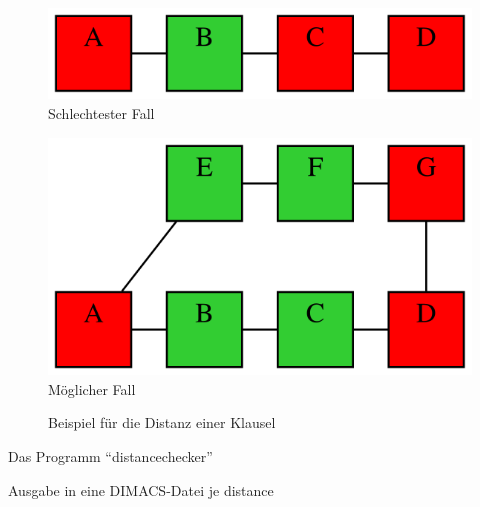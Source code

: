 \begin{figure}[!h]
  \centering
  \begin{minipage}[b]{6cm}
    \centering
    \includegraphics[scale=0.6]{images/distance1}\\
    Schlechtester Fall
  \end{minipage}
  \begin{minipage}[b]{6cm}
    \centering
    \includegraphics[scale=0.6]{images/distance2}\\
    Möglicher Fall
  \end{minipage}
  \caption{Beispiel für die Distanz einer Klausel}
  \label{fig:distance}
\end{figure}

Das Programm "`distancechecker"'

Ausgabe in eine DIMACS-Datei je distance

